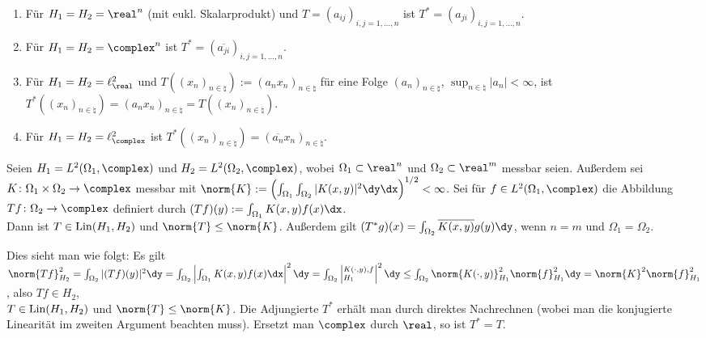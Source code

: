 \begin{Bsp}
    \begin{enumerate}[label=\emph{(\alph*)}]
        \item
        Für $H_1 = H_2 = \real^n$ (mit eukl. Skalarprodukt) und
        $T = (a_{ij})_{i,j=1,\dotsc,n}$ ist $T^\ast = (a_{ji})_{i,j=1,\dotsc,n}$.
        
        \item
        Für $H_1 = H_2 = \complex^n$ ist $T^\ast = (\overline{a_{ji}})_{i,j=1,\dotsc,n}$.
        
        \item
        Für $H_1 = H_2 = \ell^2_\real$ und
        $T((x_n)_{n \in \natural}) := (a_n x_n)_{n \in \natural}$ für eine Folge
        $(a_n)_{n \in \natural}$, $\sup_{n \in \natural} |a_n| < \infty$, ist
        $T^\ast((x_n)_{n \in \natural}) = (a_n x_n)_{n \in \natural} = T((x_n)_{n \in \natural})$.
        
        \item
        Für $H_1 = H_2 = \ell^2_\complex$ ist
        $T^\ast((x_n)_{n \in \natural}) = (\overline{a_n} x_n)_{n \in \natural}$.
    \end{enumerate}
\end{Bsp}

\linie

\begin{Bsp}
    Seien $H_1 = L^2(\Omega_1, \complex)$ und $H_2 = L^2(\Omega_2, \complex)$,
    wobei $\Omega_1 \subset \real^n$ und $\Omega_2 \subset \real^m$ messbar seien.
    Außerdem sei $K\colon \Omega_1 \times \Omega_2 \rightarrow \complex$ messbar
    mit $\norm{K} := \left(\int_{\Omega_1} \int_{\Omega_2}
    |K(x, y)|^2 \dy \dx\right)^{1/2} < \infty$.
    Sei für $f \in L^2(\Omega_1, \complex)$ die Abbildung $Tf\colon \Omega_2 \rightarrow \complex$
    definiert durch $(Tf)(y) := \int_{\Omega_1} K(x, y)f(x)\dx$.\\
    Dann ist $T \in \operatorname{Lin}(H_1, H_2)$ und $\norm{T} \le \norm{K}$.
    Außerdem gilt $(T^\ast g)(x) = \int_{\Omega_2} \overline{K(x, y)} g(y) \dy$,
    wenn $n = m$ und $\Omega_1 = \Omega_2$.
    
    Dies sieht man wie folgt:
    Es gilt $\norm{Tf}_{H_2}^2 = \int_{\Omega_2} |(Tf)(y)|^2 \dy
    = \int_{\Omega_2} \left|\int_{\Omega_1} K(x, y)f(x)\dx\right|^2 \dy\\
    = \int_{\Omega_2} \left|\sp{K(\cdot, y), f}_{H_1}\right|^2 \dy
    \le \int_{\Omega_2} \norm{K(\cdot, y)}_{H_1}^2 \norm{f}_{H_1}^2 \dy
    = \norm{K}^2 \norm{f}_{H_1}^2$,
    also $Tf \in H_2$,\\
    $T \in \operatorname{Lin}(H_1, H_2)$ und $\norm{T} \le \norm{K}$.
    Die Adjungierte $T^\ast$ erhält man durch direktes Nachrechnen
    (wobei man die konjugierte Linearität im zweiten Argument beachten muss).
    Ersetzt man $\complex$ durch $\real$, so ist $T^\ast = T$.
\end{Bsp}

